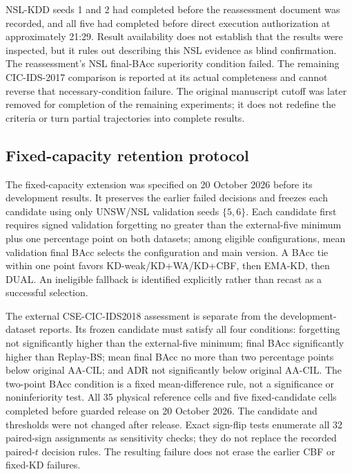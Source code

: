 \documentclass[10pt,twocolumn]{article}
\providecommand{\RetentionComparisonAppendix}{}
\providecommand{\CompactCapacityAppendix}{}
\providecommand{\KDReassessmentTables}{}
\begin{document}
NSL-KDD seeds 1 and 2 had completed before the reassessment document was recorded, and all five had completed before direct execution authorization at approximately 21:29. Result availability does not establish that the results were inspected, but it rules out describing this NSL evidence as blind confirmation. The reassessment's NSL final-BAcc superiority condition failed. The remaining CIC-IDS-2017 comparison is reported at its actual completeness and cannot reverse that necessary-condition failure. The original manuscript cutoff was later removed for completion of the remaining experiments; it does not redefine the criteria or turn partial trajectories into complete results.

\subsection{Fixed-capacity retention protocol}\label{app:compact-protocol}
The fixed-capacity extension was specified on 20 October 2026 before its development results. It preserves the earlier failed decisions and freezes each candidate using only UNSW/NSL validation seeds $\{5,6\}$. Each candidate first requires signed validation forgetting no greater than the external-five minimum plus one percentage point on both datasets; among eligible configurations, mean validation final BAcc selects the configuration and main version. A BAcc tie within one point favors KD-weak/KD+WA/KD+CBF, then EMA-KD, then DUAL. An ineligible fallback is identified explicitly rather than recast as a successful selection.

The external CSE-CIC-IDS2018 assessment is separate from the development-dataset reports. Its frozen candidate must satisfy all four conditions: forgetting not significantly higher than the external-five minimum; final BAcc significantly higher than Replay-BS; mean final BAcc no more than two percentage points below original AA-CIL; and ADR not significantly below original AA-CIL. The two-point BAcc condition is a fixed mean-difference rule, not a significance or noninferiority test. All 35 physical reference cells and five fixed-candidate cells completed before guarded release on 20 October 2026. The candidate and thresholds were not changed after release. Exact sign-flip tests enumerate all 32 paired-sign assignments as sensitivity checks; they do not replace the recorded paired-$t$ decision rules. The resulting failure does not erase the earlier CBF or fixed-KD failures.

\RetentionComparisonAppendix
\KDReassessmentTables
\CompactCapacityAppendix
\end{document}
